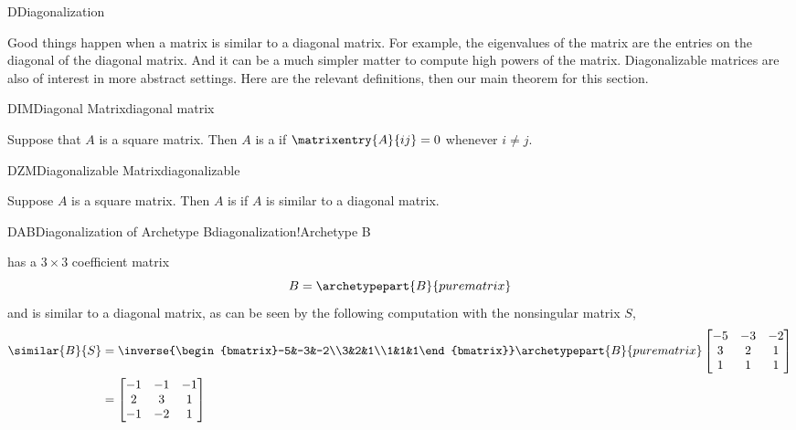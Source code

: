 \begin{subsect}{D}{Diagonalization}
%
\begin{para}Good things happen when a matrix is similar to a diagonal matrix.  For example, the eigenvalues of the matrix are the  entries on the diagonal of the diagonal matrix.  And it can be a much simpler matter to compute high powers of the matrix.  Diagonalizable matrices are also of interest in more abstract settings.  Here are the relevant definitions, then our main theorem for this section.\end{para}
%
\begin{definition}{DIM}{Diagonal Matrix}{diagonal matrix}
\begin{para}Suppose that $A$ is a square matrix.  Then $A$ is a  if $\matrixentry{A}{ij}=0$ whenever $i\neq j$.\end{para}
\end{definition}
%
%
\begin{definition}{DZM}{Diagonalizable Matrix}{diagonalizable}
\begin{para}Suppose $A$ is a square matrix.  Then $A$ is  if $A$ is similar to a diagonal matrix.\end{para}
\end{definition}
%
%
\begin{example}{DAB}{Diagonalization of Archetype B}{diagonalization!Archetype B}
%
\begin{para} has a $3\times 3$ coefficient matrix
%
\begin{equation*}
B=\archetypepart{B}{purematrix}\end{equation*}
%
and is similar to a diagonal matrix, as can be seen by the following computation with the nonsingular matrix $S$,
%
\begin{align*}
\similar{B}{S}&=
\inverse{\begin{bmatrix}-5&-3&-2\\3&2&1\\1&1&1\end{bmatrix}}
\archetypepart{B}{purematrix}\begin{bmatrix}-5&-3&-2\\3&2&1\\1&1&1\end{bmatrix}\\
%
&=\begin{bmatrix}-1&-1&-1\\2&3&1\\-1&-2&1\end{bmatrix}

\end{align*}
\end{para}
\end{example}
\end{subsect}

